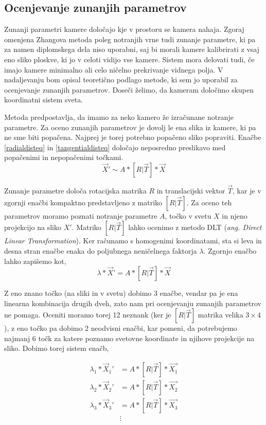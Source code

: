 \documentclass[a4paper, 12pt]{book}
\begin{document}
\subsection{Ocenjevanje zunanjih parametrov}\label{externalparamssection}
Zunanji parametri kamere določajo kje v prostoru se kamera nahaja. Zgoraj omenjena Zhangova metoda poleg notranjih vrne tudi zunanje parametre, ki pa za namen diplomskega dela niso uporabni, saj bi morali kamere kalibrirati z vsaj eno sliko ploskve, ki jo v celoti vidijo vse kamere. Sistem mora delovati tudi, če imajo kamere minimalno ali celo ničelno prekrivanje vidnega polja. V nadaljevanju bom opisal teoretično podlago metode, ki sem jo uporabil za ocenjevanje zunanjih parametrov. Doseči želimo, da kameram določimo skupen koordinatni sistem sveta.

Metoda predpostavlja, da imamo za neko kamero že izračunane notranje parametre. Za oceno zunanjih parametrov je dovolj le ena slika iz kamere, ki pa ne sme biti popačena. Najprej je torej potrebno popačeno sliko popraviti. Enačbe \eqref{radialdisteq} in \eqref{tangentialdisteq} določajo neposredno preslikavo med popačenimi in nepopačenimi točkami. 
\begin{equation}
\vec{X}' \sim A * [R | \vec{T}] * \vec{X}
\end{equation}

Zunanje parametre določa rotacijska matrika $R$ in translacijski vektor $\vec{T}$, kar je v zgornji enačbi kompaktno predstavljeno z matriko $[R | \vec{T}]$. Za oceno teh parametrov moramo poznati notranje parametre $A$, točko v svetu $X$ in njeno projekcijo na sliko $X'$. Matriko $[R | \vec{T}]$ lahko ocenimo z metodo DLT (\emph{ang. Direct Linear Transformation}). Ker računamo s homogenimi koordinatami, sta si leva in desna stran enačbe enaka do poljubnega neničelnega faktorja $\lambda$. Zgornjo enačbo lahko zapišemo kot,
\begin{equation}
\lambda * \vec{X}' = A * [R | \vec{T}] * \vec{X}
\label{lambdaeq}
\end{equation}

Z eno znano točko (na sliki in v svetu) dobimo 3 enačbe, vendar pa je ena linearna kombinacija drugih dveh, zato nam pri ocenjevanju zunanjih parametrov ne pomaga. Oceniti moramo torej 12 neznank (ker je $[R | \vec{T}]$ matrika velika $3 \times 4$), z eno točko pa dobimo 2 neodvisni enačbi, kar pomeni, da potrebujemo najmanj 6 točk za katere poznamo svetovne koordinate in njihove projekcije na sliko. Dobimo torej sistem enačb,

\begin{align*}
\lambda_1 * \vec{X}_1' &= A * [R | \vec{T}] * \vec{X_1} \\
\lambda_2 * \vec{X}_2' &= A * [R | \vec{T}] * \vec{X_2} \\
\lambda_3 * \vec{X}_3' &= A * [R | \vec{T}] * \vec{X_3} \\
&\vdots
\end{align*}
\end{document}
